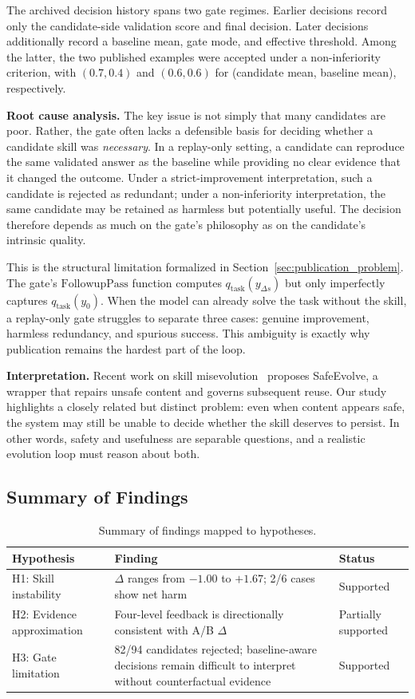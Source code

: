 ﻿\documentclass[preprint,12pt]{elsarticle}
\begin{document}
The archived decision history spans two gate regimes.  Earlier decisions
record only the candidate-side validation score and final decision.  Later
decisions additionally record a baseline mean, gate mode, and effective
threshold.  Among the latter, the two published examples were accepted
under a non-inferiority criterion, with $(0.7, 0.4)$ and $(0.6, 0.6)$ for
(candidate mean, baseline mean), respectively.

\textbf{Root cause analysis.}
The key issue is not simply that many candidates are poor.  Rather, the
gate often lacks a defensible basis for deciding whether a candidate skill
was \emph{necessary}.  In a replay-only setting, a candidate can reproduce
the same validated answer as the baseline while providing no clear evidence
that it changed the outcome.  Under a strict-improvement interpretation,
such a candidate is rejected as redundant; under a non-inferiority
interpretation, the same candidate may be retained as harmless but
potentially useful.  The decision therefore depends as much on the gate's
philosophy as on the candidate's intrinsic quality.

This is the structural limitation formalized in
Section~\ref{sec:publication_problem}.  The gate's
$\mathrm{FollowupPass}$ function computes $q_{\mathrm{task}}(y_{\Delta s})$
but only imperfectly captures $q_{\mathrm{task}}(y_0)$.  When the model can
already solve the task without the skill, a replay-only gate struggles to
separate three cases: genuine improvement, harmless redundancy, and
spurious success.  This ambiguity is exactly why publication remains the
hardest part of the loop.

\textbf{Interpretation.}
Recent work on skill misevolution~\cite{misevolution} proposes SafeEvolve, a wrapper that repairs unsafe
content and governs subsequent reuse.  Our study highlights a closely
related but distinct problem: even when content appears safe, the system
may still be unable to decide whether the skill deserves to persist.  In
other words, safety and usefulness are separable questions, and a realistic
evolution loop must reason about both.

\subsection{Summary of Findings}

\begin{table}[t]
\centering
\caption{Summary of findings mapped to hypotheses.}
\label{tab:findings}
\small
\begin{tabularx}{\textwidth}{lXl}
\toprule
Hypothesis & Finding & Status \\
\midrule
H1: Skill instability & $\Delta$ ranges from $-1.00$ to $+1.67$; 2/6 cases show net harm & Supported \\
H2: Evidence approximation & Four-level feedback is directionally consistent with A/B $\Delta$ & Partially supported \\
H3: Gate limitation & 82/94 candidates rejected; baseline-aware decisions remain difficult to interpret without counterfactual evidence & Supported \\
\bottomrule
\end{tabularx}
\end{table}
\end{document}
